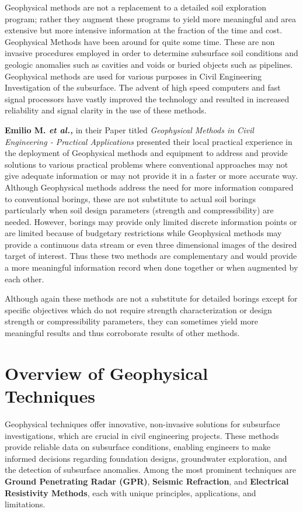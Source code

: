 \documentclass[12pt,a4paper]{report}
\begin{document}
Geophysical methods are not a replacement to a detailed soil exploration program; rather they augment these programs to yield more meaningful and area extensive but more intensive information at the fraction of the time and cost. Geophysical Methods have been around for quite some time. These are non invasive procedures employed in order to determine subsurface soil conditions and geologic anomalies such as cavities and voids or buried objects such as pipelines. Geophysical methods are used for various purposes in Civil Engineering Investigation of the subsurface. The advent of high speed computers and fast signal processors have vastly improved the technology and resulted in increased reliability and signal clarity in the use of these methods.

\textbf{Emilio M. \textit{et al.,}} in their Paper titled \textit{Geophysical Methods in Civil Engineering - Practical Applications} presented their local practical experience in the deployment of Geophysical methods and equipment to address and provide solutions to various practical problems where conventional approaches may not give adequate information or may not provide it in a faster or more accurate way. Although Geophysical methods address the need for more information compared to conventional borings, these are not substitute to actual soil borings particularly when soil design parameters (strength and compressibility) are needed. However, borings may provide only limited discrete information points or are limited because of budgetary restrictions while Geophysical methods may provide a continuous data stream or even three dimensional images of the desired target of interest. Thus these two methods are complementary and would provide a more meaningful information record when done together or when augmented by each other.

Although again these methods are not a substitute for detailed borings except for specific objectives which do not require strength characterization or design strength or compressibility parameters, they can sometimes yield more meaningful results and thus corroborate results of other methods.

\section{Overview of Geophysical Techniques}
Geophysical techniques offer innovative, non-invasive solutions for subsurface investigations, which are crucial in civil engineering projects. These methods provide reliable data on subsurface conditions, enabling engineers to make informed decisions regarding foundation designs, groundwater exploration, and the detection of subsurface anomalies. Among the most prominent techniques are \textbf{Ground Penetrating Radar (GPR)}, \textbf{Seismic Refraction}, and \textbf{Electrical Resistivity Methods}, each with unique principles, applications, and limitations.
\end{document}
